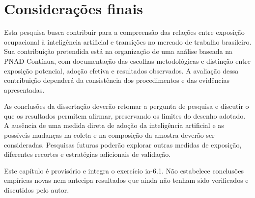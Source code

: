 \section{Considerações finais}
\label{sec:consideracoes}

Esta pesquisa busca contribuir para a compreensão das relações entre exposição ocupacional à inteligência artificial e transições no mercado de trabalho brasileiro. Sua contribuição pretendida está na organização de uma análise baseada na PNAD Contínua, com documentação das escolhas metodológicas e distinção entre exposição potencial, adoção efetiva e resultados observados. A avaliação dessa contribuição dependerá da consistência dos procedimentos e das evidências apresentadas.

As conclusões da dissertação deverão retomar a pergunta de pesquisa e discutir o que os resultados permitem afirmar, preservando os limites do desenho adotado. A ausência de uma medida direta de adoção da inteligência artificial e as possíveis mudanças na coleta e na composição da amostra deverão ser consideradas. Pesquisas futuras poderão explorar outras medidas de exposição, diferentes recortes e estratégias adicionais de validação.

Este capítulo é provisório e integra o exercício ia-6.1. Não estabelece conclusões empíricas novas nem antecipa resultados que ainda não tenham sido verificados e discutidos pelo autor.
